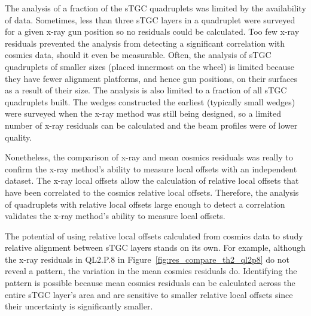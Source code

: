 The analysis of a fraction of the sTGC quadruplets was limited by the availability of data. Sometimes, less than three sTGC layers in a quadruplet were surveyed for a given x-ray gun position so no residuals could be calculated. Too few x-ray residuals prevented the analysis from detecting a significant correlation with cosmics data, should it even be measurable. Often, the analysis of sTGC quadruplets of smaller sizes (placed innermost on the wheel) is limited because they have fewer alignment platforms, and hence gun positions, on their surfaces as a result of their size. The analysis is also limited to a fraction of all sTGC quadruplets built. The wedges constructed the earliest (typically small wedges) were surveyed when the x-ray method was still being designed, so a limited number of x-ray residuals can be calculated and the beam profiles were of lower quality. 

Nonetheless, the comparison of x-ray and mean cosmics residuals was really to confirm the x-ray method's ability to measure local offsets with an independent dataset. The x-ray local offsets allow the calculation of relative local offsets that have been correlated to the cosmics relative local offsets. Therefore, the analysis of quadruplets with relative local offsets large enough to detect a correlation validates the x-ray method's ability to measure local offsets. 

The potential of using relative local offsets calculated from cosmics data to study relative alignment between sTGC layers stands on its own. For example, although the x-ray residuals in QL2.P.8 in Figure~\ref{fig:res_compare_th2_ql2p8} do not reveal a pattern, the variation in the mean cosmics residuals do. Identifying the pattern is possible because mean cosmics residuals can be calculated across the entire sTGC layer's area and are sensitive to smaller relative local offsets since their uncertainty is significantly smaller. 


